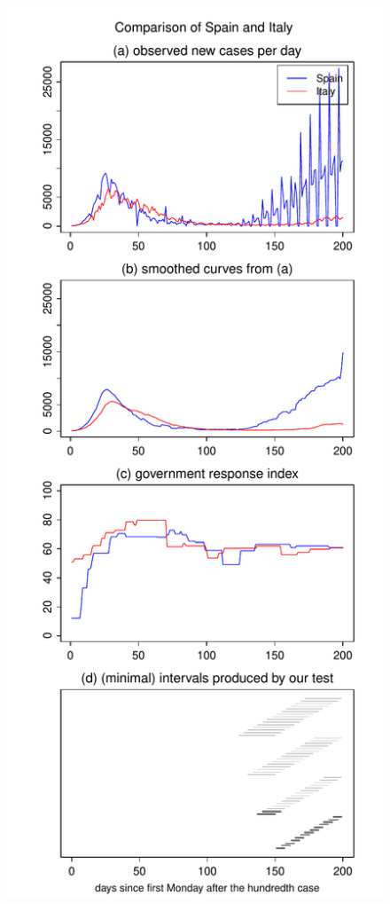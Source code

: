 \documentclass[a4paper,12pt]{article}
\numberwithin{equation}{section}
\begin{document}
{\begin{figure}[p!]
\begin{minipage}[t]{0.49\textwidth}
\includegraphics[width=\textwidth]{plots/ESP_vs_ITA_long}

\end{minipage}
\end{figure}}
\end{document}
